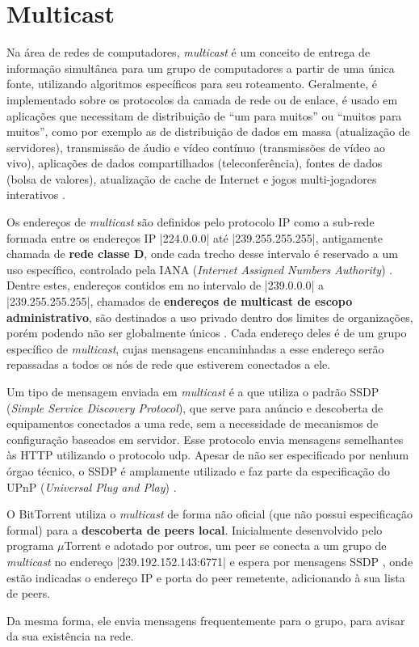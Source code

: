 
\newpage
\section{Multicast}

Na área de redes de computadores, \emph{multicast} é um conceito de entrega de
informação simultânea para um grupo de computadores a partir de uma única fonte,
utilizando algoritmos específicos para seu roteamento. Geralmente, é implementado sobre
os protocolos da camada de rede ou de enlace, é usado em aplicações que necessitam de
distribuição de ``um para muitos'' ou ``muitos para muitos'', como por exemplo as de
distribuição de dados em massa (atualização de servidores), transmissão de áudio e vídeo
contínuo (transmissões de vídeo ao vivo), aplicações de dados compartilhados
(teleconferência), fontes de dados (bolsa de valores), atualização de cache de Internet
e jogos multi-jogadores interativos \cite{book:kurose}.

Os endereços de \emph{multicast} são definidos pelo protocolo IP como a sub-rede formada
entre os endereços IP \sverb|224.0.0.0| até \sverb|239.255.255.255|, antigamente chamada
de \textbf{rede classe D}, onde cada trecho desse intervalo é reservado a um uso
específico, controlado pela IANA (\emph{Internet Assigned Numbers Authority})
\cite{site:iana-multicast}. Dentre estes, endereços contidos em no intervalo de
\sverb|239.0.0.0| a \sverb|239.255.255.255|, chamados de
\textbf{endereços de multicast de escopo administrativo}, são destinados a uso privado
dentro dos limites de organizações, porém podendo não ser globalmente únicos
\cite{site:rfcmulticast}. Cada endereço deles é de um grupo específico de
\emph{multicast}, cujas mensagens encaminhadas a esse endereço serão repassadas a todos
os nós de rede que estiverem conectados a ele.

Um tipo de mensagem enviada em \emph{multicast} é a que utiliza o padrão SSDP
(\emph{Simple Service Discovery Protocol}), que serve para anúncio e descoberta de
equipamentos conectados a uma rede, sem a necessidade de mecanismos de configuração
baseados em servidor. Esse protocolo envia mensagens semelhantes às HTTP utilizando o
protocolo \gls{udp}. Apesar de não ser especificado por nenhum órgao técnico, o SSDP é
amplamente utilizado e faz parte da especificação do UPnP
(\emph{Universal Plug and Play}) \cite{site:upnp}.

O BitTorrent utiliza o \emph{multicast} de forma não oficial (que não possui
especificação formal) para a \textbf{descoberta de \glspl*{peer} local}. Inicialmente
desenvolvido pelo programa $\mu$Torrent e adotado por outros, um \gls*{peer} se
conecta a um grupo de \emph{multicast} no endereço \sverb|239.192.152.143:6771| e
espera por mensagens SSDP \cite{site:utorrent-forum}, onde estão indicadas o endereço
IP e porta do \gls*{peer} remetente, adicionando à sua lista de \glspl*{peer}.


\newpage
Da mesma forma, ele envia mensagens frequentemente para o grupo, para avisar da sua
existência na rede.

